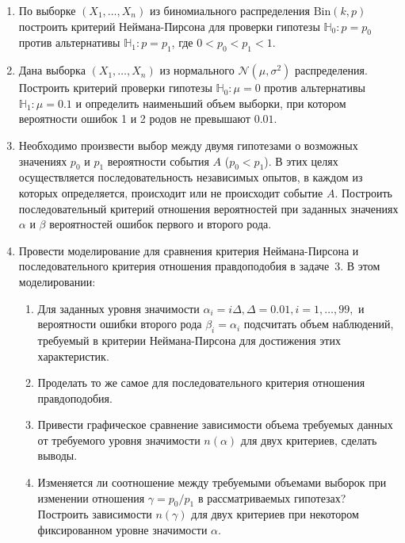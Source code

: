 \documentclass[a4paper,14pt]{extreport}
\renewcommand{\=}[1]{\stackrel{#1}{=}} %
\begin{document}
\begin{enumerate}

    \item По выборке $(X_1, \ldots, X_n)$ из
    биномиального распределения $\text{Bin}(k, p)$
    построить критерий Неймана-Пирсона 
    для проверки гипотезы $\mathbb{H}_0: p = p_0$
    против альтернативы $\mathbb{H}_1: p = p_1$,
    где $0 < p_0 < p_1 < 1$.

    \item Дана выборка $(X_1, \ldots, X_n)$ из
    нормального $\mathcal{N}(\mu, \sigma^2)$
    распределения. Построить
    критерий проверки гипотезы $\mathbb{H}_0: \mu = 0$
    против альтернативы $\mathbb{H}_1: \mu = 0.1$
    и определить наименьший объем выборки, 
    при котором вероятности ошибок 1 и 2 родов
    не превышают $0.01$. 

    \item Необходимо произвести выбор между
    двумя гипотезами о возможных значениях $p_0$
    и $p_1$ вероятности события $A$ ($p_0 < p_1$).
    В этих целях осуществляется последовательность
    независимых опытов, в каждом из которых
    определяется, происходит или не происходит
    событие $A$. Построить последовательный
    критерий отношения вероятностей при заданных
    значениях $\alpha$ и $\beta$ вероятностей
    ошибок первого и второго рода.

    
    \item Провести моделирование для сравнения
    критерия Неймана-Пирсона и последовательного 
    критерия отношения правдоподобия в задаче~3.
    В этом моделировании:
    \begin{enumerate}
        \item Для заданных уровня значимости
        $\alpha_i = i\Delta,
        \Delta = 0.01, i = 1, \ldots, 99,$
        и вероятности ошибки второго рода 
        $\beta_i = \alpha_i$ подсчитать 
        объем наблюдений, требуемый в критерии 
        Неймана-Пирсона для достижения этих
        характеристик.

        \item Проделать то же самое для 
        последовательного критерия отношения
        правдоподобия.

        \item Привести графическое сравнение
        зависимости объема требуемых данных
        от требуемого уровня значимости 
        $n(\alpha)$ для двух критериев, сделать
        выводы.

        \item Изменяется ли соотношение 
        между требуемыми объемами выборок
        при изменении отношения $\gamma = p_0 / p_1$
        в рассматриваемых гипотезах? 
        Построить зависимости $n(\gamma)$
        для двух критериев при некотором фиксированном
        уровне значимости $\alpha$.
    \end{enumerate}


\end{enumerate}
\end{document}
